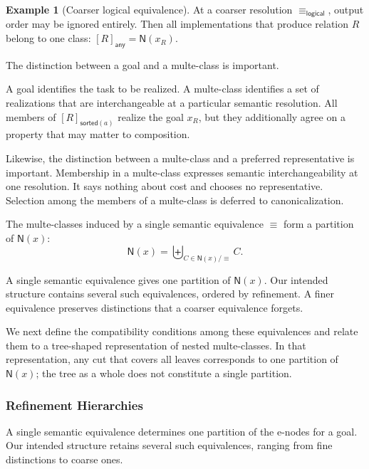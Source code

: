 \documentclass[sigconf,nonacm]{acmart}
\theoremstyle{definition}
\newtheorem{example}[definition]{Example}
\theoremstyle{plain}
\theoremstyle{remark}
\begin{document}
\begin{example}[Coarser logical equivalence]
At a coarser resolution \(\equiv_{\mathsf{logical}}\), output order
may be ignored entirely.  Then all implementations that produce
relation \(R\) belong to one class:
\([R]_{\mathsf{any}} = \mathsf{N}(x_R)\).
\end{example}

The distinction between a goal and a multe-class is important.

A goal identifies the task to be realized.
A multe-class identifies a set of realizations that are
interchangeable at a particular semantic resolution.
All members of \([R]_{\mathsf{sorted}(a)}\) realize the goal
\(x_R\), but they additionally agree on a property that may matter
to composition.

Likewise, the distinction between a multe-class and a preferred
representative is important.
Membership in a multe-class expresses semantic interchangeability at
one resolution.
It says nothing about cost and chooses no representative.
Selection among the members of a multe-class is deferred to
canonicalization.

The multe-classes induced by a single semantic equivalence
\(\equiv\) form a partition of \(\mathsf{N}(x)\):
\[
\mathsf{N}(x)
=
\biguplus_{C\in \mathsf{N}(x)/{\equiv}} C.
\]

A single semantic equivalence gives one partition of
\(\mathsf{N}(x)\).  Our intended structure contains several such
equivalences, ordered by refinement.  A finer equivalence preserves
distinctions that a coarser equivalence forgets.

We next define the compatibility conditions among these
equivalences and relate them to a tree-shaped representation of nested
multe-classes.  In that representation, any cut that covers all leaves
corresponds to one partition of \(\mathsf{N}(x)\); the tree as a whole
does not constitute a single partition.

\subsubsection{Refinement Hierarchies}
\label{sec:refinement-hierarchies}

A single semantic equivalence determines one partition of the e-nodes
for a goal.  Our intended structure retains several such equivalences,
ranging from fine distinctions to coarse ones.
\end{document}
